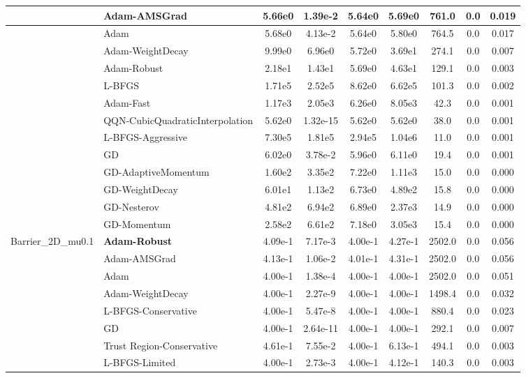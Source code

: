 \documentclass{article}
\begin{document}
\begin{longtable}{|l|l|c|c|c|c|c|c|c|}
\hline
 & Adam-AMSGrad & 5.66e0 & 1.39e-2 & 5.64e0 & 5.69e0 & 761.0 & 0.0 & 0.019 \\
\hline
 & Adam & 5.68e0 & 4.13e-2 & 5.64e0 & 5.80e0 & 764.5 & 0.0 & 0.017 \\
\hline
 & Adam-WeightDecay & 9.99e0 & 6.96e0 & 5.72e0 & 3.69e1 & 274.1 & 0.0 & 0.007 \\
\hline
 & Adam-Robust & 2.18e1 & 1.43e1 & 5.69e0 & 4.63e1 & 129.1 & 0.0 & 0.003 \\
\hline
 & L-BFGS & 1.71e5 & 2.52e5 & 8.62e0 & 6.62e5 & 101.3 & 0.0 & 0.002 \\
\hline
 & Adam-Fast & 1.17e3 & 2.05e3 & 6.26e0 & 8.05e3 & 42.3 & 0.0 & 0.001 \\
\hline
 & QQN-CubicQuadraticInterpolation & 5.62e0 & 1.32e-15 & 5.62e0 & 5.62e0 & 38.0 & 0.0 & 0.001 \\
\hline
 & L-BFGS-Aggressive & 7.30e5 & 1.81e5 & 2.94e5 & 1.04e6 & 11.0 & 0.0 & 0.001 \\
\hline
 & GD & 6.02e0 & 3.78e-2 & 5.96e0 & 6.11e0 & 19.4 & 0.0 & 0.001 \\
\hline
 & GD-AdaptiveMomentum & 1.60e2 & 3.35e2 & 7.22e0 & 1.11e3 & 15.0 & 0.0 & 0.000 \\
\hline
 & GD-WeightDecay & 6.01e1 & 1.13e2 & 6.73e0 & 4.89e2 & 15.8 & 0.0 & 0.000 \\
\hline
 & GD-Nesterov & 4.81e2 & 6.94e2 & 6.89e0 & 2.37e3 & 14.9 & 0.0 & 0.000 \\
\hline
 & GD-Momentum & 2.58e2 & 6.61e2 & 7.18e0 & 3.05e3 & 15.4 & 0.0 & 0.000 \\
Barrier\_2D\_mu0.1 & \textbf{Adam-Robust} & 4.09e-1 & 7.17e-3 & 4.00e-1 & 4.27e-1 & 2502.0 & 0.0 & 0.056 \\
\hline
 & Adam-AMSGrad & 4.13e-1 & 1.06e-2 & 4.01e-1 & 4.31e-1 & 2502.0 & 0.0 & 0.056 \\
\hline
 & Adam & 4.00e-1 & 1.38e-4 & 4.00e-1 & 4.00e-1 & 2502.0 & 0.0 & 0.051 \\
\hline
 & Adam-WeightDecay & 4.00e-1 & 2.27e-9 & 4.00e-1 & 4.00e-1 & 1498.4 & 0.0 & 0.032 \\
\hline
 & L-BFGS-Conservative & 4.00e-1 & 5.47e-8 & 4.00e-1 & 4.00e-1 & 880.4 & 0.0 & 0.023 \\
\hline
 & GD & 4.00e-1 & 2.64e-11 & 4.00e-1 & 4.00e-1 & 292.1 & 0.0 & 0.007 \\
\hline
 & Trust Region-Conservative & 4.61e-1 & 7.55e-2 & 4.00e-1 & 6.13e-1 & 494.1 & 0.0 & 0.003 \\
\hline
 & L-BFGS-Limited & 4.00e-1 & 2.73e-3 & 4.00e-1 & 4.12e-1 & 140.3 & 0.0 & 0.003 \\

\end{longtable}
\end{document}
